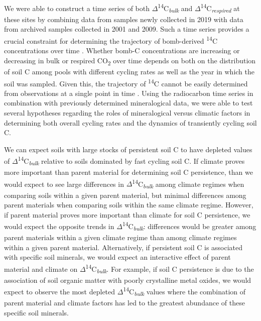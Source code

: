 \documentclass[soil, manuscript]{copernicus}
\begin{document}
We were able to construct a time series of both
\(\Delta\)\textsuperscript{14}C\textsubscript{\emph{bulk}} and
\(\Delta\)\textsuperscript{14}C\textsubscript{\emph{respired}} at these
sites by combining data from samples newly collected in 2019 with data
from archived samples collected in 2001 and 2009. Such a time series
provides a crucial constraint for determining the trajectory of
bomb-derived \textsuperscript{14}C concentrations over time
\citep{beem-miller2021, stoner2021}. Whether bomb-C concentrations are
increasing or decreasing in bulk or respired CO\textsubscript{2} over
time depends on both on the distribution of soil C among pools with
different cycling rates as well as the year in which the soil was
sampled. Given this, the trajectory of \textsuperscript{14}C cannot be
easily determined from observations at a single point in time
\citep{baisden2013}. Using the radiocarbon time series in combination
with previously determined mineralogical data, we were able to test
several hypotheses regarding the roles of mineralogical versus climatic
factors in determining both overall cycling rates and the dynamics of
transiently cycling soil C.

We can expect soils with large stocks of persistent soil C to have
depleted values of
\(\Delta\)\textsuperscript{14}C\textsubscript{\emph{bulk}} relative to
soils dominated by fast cycling soil C. If climate proves more important
than parent material for determining soil C persistence, than we would
expect to see large differences in
\(\Delta\)\textsuperscript{14}C\textsubscript{\emph{bulk}} among climate
regimes when comparing soils within a given parent material, but minimal
differences among parent materials when comparing soils within the same
climate regime. However, if parent material proves more important than
climate for soil C persistence, we would expect the opposite trends in
\(\Delta\)\textsuperscript{14}C\textsubscript{\emph{bulk}}: differences
would be greater among parent materials within a given climate regime
than among climate regimes within a given parent material.
Alternatively, if persistent soil C is associated with specific soil
minerals, we would expect an interactive effect of parent material and
climate on \(\Delta\)\textsuperscript{14}C\textsubscript{\emph{bulk}}.
For example, if soil C persistence is due to the association of soil
organic matter with poorly crystalline metal oxides, we would expect to
observe the most depleted
\(\Delta\)\textsuperscript{14}C\textsubscript{\emph{bulk}} values where
the combination of parent material and climate factors has led to the
greatest abundance of these specific soil minerals.
\end{document}
